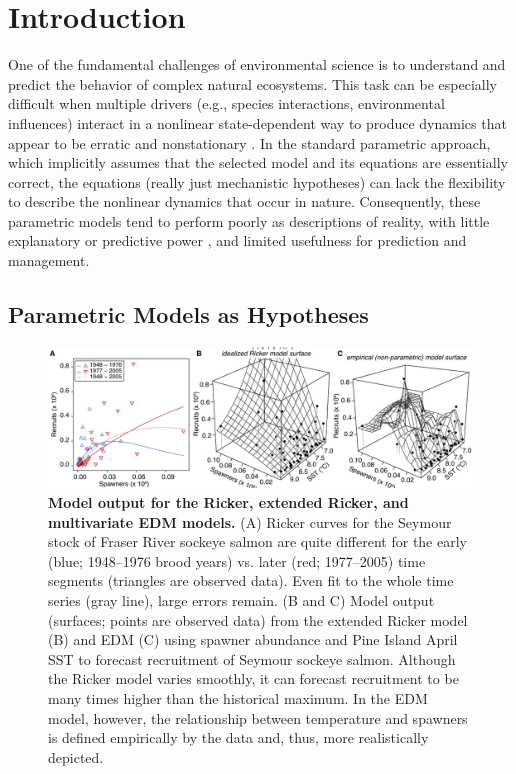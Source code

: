 \section{Introduction}
One of the fundamental challenges of environmental science is to understand and predict the behavior of complex natural ecosystems. This task can be especially difficult when multiple drivers (e.g., species interactions, environmental influences) interact in a nonlinear state-dependent way to produce dynamics that appear to be erratic and nonstationary \cite{Dixon_1999}. In the standard parametric approach, which implicitly assumes that the selected model and its equations are essentially correct, the equations (really just mechanistic hypotheses) can lack the flexibility to describe the nonlinear dynamics that occur in nature. Consequently, these parametric models tend to perform poorly as descriptions of reality, with little explanatory or predictive power \cite{Perretti_2013, Wood_1999}, and limited usefulness for prediction and management.

\subsection{Parametric Models as Hypotheses}

\begin{figure}[!ht]
\begin{center}\includegraphics[width=\maxwidth{\textwidth}]{fig_salmon_1.pdf}\end{center}
\caption[Model output for the Ricker, extended Ricker, and multivariate EDM models.]{\textbf{Model output for the Ricker, extended Ricker, and multivariate EDM models.}\newline
(A) Ricker curves for the Seymour stock of Fraser River sockeye salmon are quite different for the early (blue; 1948--1976 brood years) vs. later (red; 1977--2005) time segments (triangles are observed data). Even fit to the whole time series (gray line), large errors remain. (B and C) Model output (surfaces; points are observed data) from the extended Ricker model (B) and EDM (C) using spawner abundance and Pine Island April SST to forecast recruitment of Seymour sockeye salmon. Although the Ricker model varies smoothly, it can forecast recruitment to be many times higher than the historical maximum. In the EDM model, however, the relationship between temperature and spawners is defined empirically by the data and, thus, more realistically depicted.}
\label{fig_salmon_model_surface}
\end{figure}


